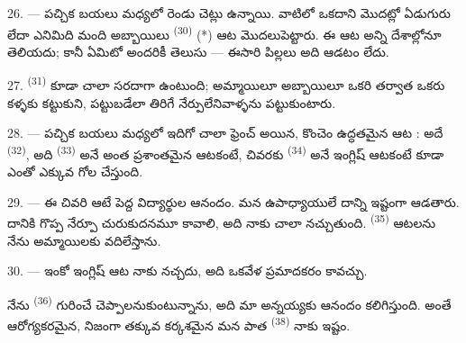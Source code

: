 
26. --- పచ్చిక బయలు మధ్యలో రెండు చెట్లు ఉన్నాయి. వాటిలో ఒకదాని మొదట్లో ఏడుగురు లేదా ఎనిమిది
మంది అబ్బాయిలు  \textsuperscript{(30)} (*) ఆట మొదలుపెట్టారు. ఈ ఆట అన్ని
దేశాల్లోనూ తెలియదు; కానీ  ఏమిటో అందరికీ తెలుసు — ఈసారి పిల్లలు అది ఆడటం
లేదు.

\VUsaut{5.0mm}
\VUsaut{3.4mm}

27.  \textsuperscript{(31)} కూడా చాలా సరదాగా ఉంటుంది; అమ్మాయిలూ అబ్బాయిలూ
ఒకరి తర్వాత ఒకరు కళ్ళకు  కట్టుకుని, పట్టుబడేలా తిరిగే నేర్పులేనివాళ్ళను
పట్టుకుంటారు.

28. --- పచ్చిక బయలు మధ్యలో ఇదిగో చాలా ఫ్రెంచ్ అయిన, కొంచెం ఉద్ధతమైన ఆట : అదే
 \textsuperscript{(32)}, అది  \textsuperscript{(33)} అనే
అంత ప్రశాంతమైన ఆటకంటే, చివరకు  \textsuperscript{(34)} అనే ఇంగ్లిష్ ఆటకంటే
కూడా ఎంతో ఎక్కువ గోల చేస్తుంది.

29. --- ఈ చివరి ఆటే పెద్ద విద్యార్థుల ఆనందం. మన ఉపాధ్యాయులే దాన్ని ఇష్టంగా ఆడతారు. దానికి
గొప్ప నేర్పూ చురుకుదనమూ కావాలి, అది నాకు చాలా నచ్చుతుంది.  \textsuperscript{(35)}
ఆటలను నేను అమ్మాయిలకు వదిలేస్తాను.

30. --- ఇంకో ఇంగ్లిష్ ఆట నాకు నచ్చదు, అది ఒకవేళ ప్రమాదకరం కావచ్చు.

నేను  \textsuperscript{(36)} గురించే చెప్పాలనుకుంటున్నాను, అది మా అన్నయ్యకు
ఆనందం కలిగిస్తుంది. అంతే ఆరోగ్యకరమైన, నిజంగా తక్కువ కర్కశమైన మన పాత 
\textsuperscript{(38)} నాకు ఇష్టం.

